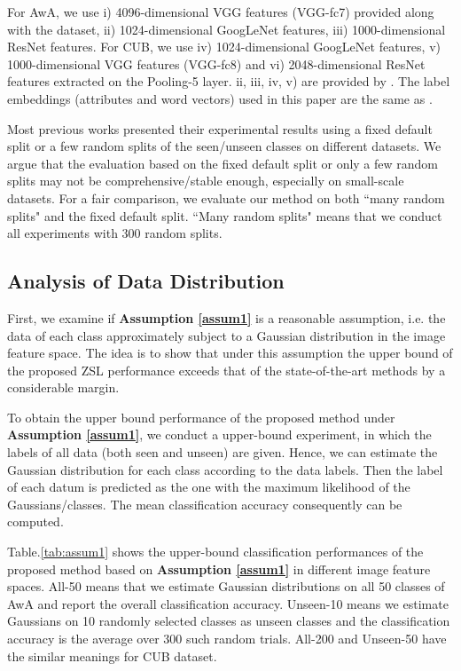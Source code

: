 \documentclass{article}
\begin{document}
For AwA, we use i) 4096-dimensional VGG features (VGG-fc7) provided along with the dataset, ii) 1024-dimensional GoogLeNet features, iii) 1000-dimensional ResNet features. For CUB, we use iv) 1024-dimensional GoogLeNet features, v) 1000-dimensional VGG features (VGG-fc8) and vi) 2048-dimensional ResNet features extracted on the Pooling-5 layer. ii, iii, iv, v) are provided by \cite{wang2016relational}. The label embeddings (attributes and word vectors) used in this paper are the same as \cite{wang2016relational}.


Most previous works presented their experimental results using a fixed default split or a few random splits of the seen/unseen classes  on different datasets. We argue that the evaluation based on the fixed default split or only a few random splits may not be comprehensive/stable enough, especially on small-scale datasets. For a fair comparison, we evaluate our method on both ``many random splits" and the fixed default split. ``Many random splits" means that we conduct all experiments with 300 random splits.


\subsection{Analysis of Data Distribution}
First, we examine if \textbf{Assumption \ref{assum1}} is a reasonable assumption, i.e. the data of each class approximately subject to a Gaussian distribution in the image feature space. The idea is to show that under this assumption the upper bound of the proposed ZSL performance exceeds that of the state-of-the-art methods by a considerable margin.

To obtain the upper bound performance of the proposed method under \textbf{Assumption \ref{assum1}}, we conduct a upper-bound experiment, in which the labels of all data (both seen and unseen) are given. Hence, we can estimate the Gaussian distribution for each class according to the data labels. Then the label of each datum is predicted as the one with the maximum likelihood of the Gaussians/classes. The mean classification accuracy consequently can be computed.

Table.\ref{tab:assum1} shows the upper-bound classification performances of the proposed method based on \textbf{Assumption \ref{assum1}} in different image feature spaces. All-50 means that we estimate Gaussian distributions on all 50 classes of AwA and report the overall classification accuracy. Unseen-10 means we estimate Gaussians on 10 randomly selected classes as unseen classes and the classification accuracy is the average over 300 such random trials. All-200 and Unseen-50 have the similar meanings for CUB dataset.
\end{document}
